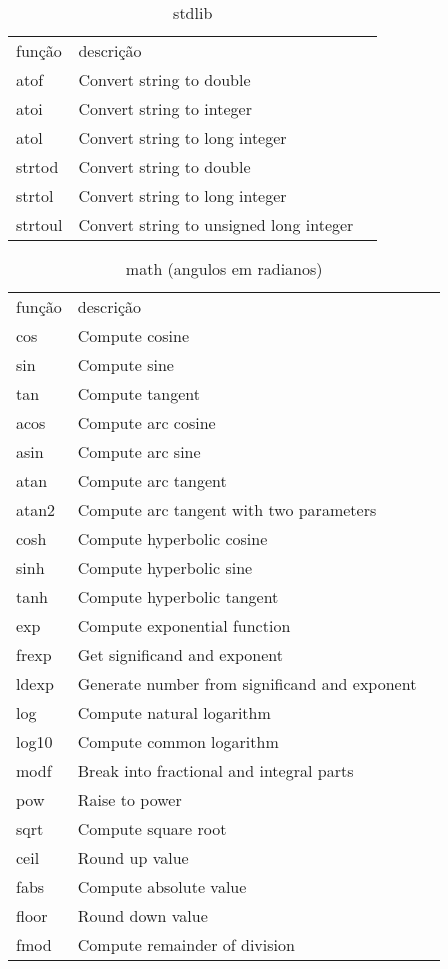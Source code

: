 \documentclass[a4paper,twocolumn, 10pt, landscape]{article}
\begin{document}
\begin{table}
 \begin{tabular}{lll}
função & descrição \\
atof & Convert string to double \\
atoi & Convert string to integer \\
atol & Convert string to long integer \\
strtod & Convert string to double \\
strtol & Convert string to long integer \\
strtoul & Convert string to unsigned long integer \\
\end{tabular}
\caption{stdlib}
\label{stdlib functions}
\end{table}

\begin{table}
 \begin{tabular}{lll}
função & descrição \\
cos &   Compute cosine  \\
sin &   Compute sine  \\
tan &   Compute tangent  \\
acos &  Compute arc cosine  \\
asin &  Compute arc sine  \\
atan &  Compute arc tangent  \\
atan2 & Compute arc tangent with two parameters  \\
cosh &  Compute hyperbolic cosine  \\
sinh &  Compute hyperbolic sine  \\
tanh &  Compute hyperbolic tangent  \\
exp &   Compute exponential function  \\
frexp & Get significand and exponent  \\
ldexp & Generate number from significand and exponent  \\
log &   Compute natural logarithm  \\
log10 & Compute common logarithm  \\
modf &  Break into fractional and integral parts  \\
pow &   Raise to power  \\
sqrt &  Compute square root  \\
ceil &  Round up value  \\
fabs &  Compute absolute value  \\
floor & Round down value  \\
fmod &  Compute remainder of division  \\
\end{tabular}
\caption{math (angulos em radianos)}
\label{math functions}
\end{table}

%
%

\clearpage
\end{document}
